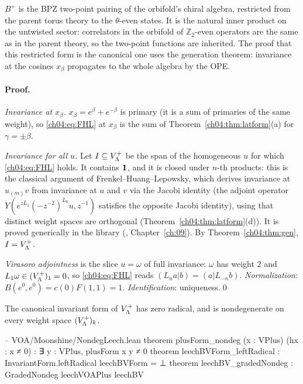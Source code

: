 \begin{physics}
$B^+$ is the BPZ two-point pairing of the orbifold's chiral algebra, restricted from the parent torus theory to the $\theta$-even states. It is the natural inner product on the untwisted sector: correlators in the orbifold of $\mathbb Z_2$-even operators are the same as in the parent theory, so the two-point functions are inherited. The proof that this restricted form is the canonical one uses the generation theorem: invariance at the cosines $x_\beta$ propagates to the whole algebra by the OPE.
\end{physics}

\paragraph{Proof.} \emph{Invariance at $x_\beta$.} $x_\beta=e^\beta+e^{-\beta}$ is primary (it is a sum
of primaries of the same weight), so \eqref{ch04:eq:FHL} at $x_\beta$ is the sum of
Theorem~\ref{ch04:thm:latform}(a) for $\gamma=\pm\beta$.

\emph{Invariance for all $u$.} Let $I\subseteq V_{\Lambda}^+$ be the span of the homogeneous $u$ for which
\eqref{ch04:eq:FHL} holds. It contains $\mathbf{1}$, and it is closed under $n$-th products: this is
the classical argument of Frenkel--Huang--Lepowsky, which derives invariance at $u_{(m)}v$ from
invariance at $u$ and $v$ via the Jacobi identity (the adjoint operator $Y(e^{zL_1}(-z^{-2})^{L_0}u,z^{-1})$
satisfies the opposite Jacobi identity), using that distinct weight spaces are orthogonal
(Theorem~\ref{ch04:thm:latform}(d)). It is proved generically in the library
(, Chapter~\ref{ch:09}). By Theorem~\ref{ch04:thm:gen}, $I=V_{\Lambda}^+$.

\emph{Virasoro adjointness} is the slice $u=\omega$ of full invariance: $\omega$ has weight $2$ and
$L_1\omega\in(V_{\Lambda}^+)_1=0$, so \eqref{ch04:eq:FHL} reads $(L_na|b)=(a|L_{-n}b)$.
\emph{Normalization}: $B(e^0,e^0)=c(0)F(1,1)=1$. \emph{Identification}: uniqueness.\qed

\begin{theorem}\label{ch04:thm:hnd}
The canonical invariant form of $V_{\Lambda}^+$ has zero radical, and is nondegenerate on every weight
space $(V_{\Lambda}^+)_k$.
\end{theorem}

\begin{leancode}
-- VOA/Moonshine/NondegLeech.lean
theorem plusForm_nondeg (x : VPlus) (hx : x ≠ 0) : ∃ y : VPlus, plusForm x y ≠ 0
theorem leechBVForm_leftRadical : InvariantForm.leftRadical leechBVForm = ⊥
theorem leechBV_gradedNondeg : GradedNondeg leechVOAPlus leechBV
\end{leancode}

